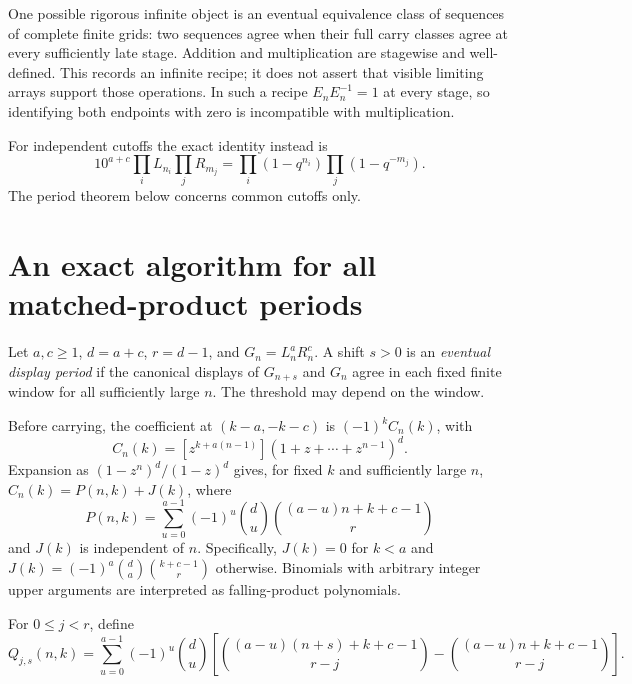\documentclass[11pt]{article}
\begin{document}
One possible rigorous infinite object is an eventual equivalence class of
sequences of complete finite grids: two sequences agree when their full
carry classes agree at every sufficiently late stage. Addition and
multiplication are stagewise and well-defined. This records an infinite
recipe; it does not assert that visible limiting arrays support those
operations. In such a recipe $E_nE_n^{-1}=1$ at every stage, so identifying
both endpoints with zero is incompatible with multiplication.

For independent cutoffs the exact identity instead is
\[
 10^{a+c}\prod_iL_{n_i}\prod_jR_{m_j}
 =\prod_i(1-q^{n_i})\prod_j(1-q^{-m_j}).
\]
The period theorem below concerns common cutoffs only.

\section{An exact algorithm for all matched-product periods}
Let $a,c\ge1$, $d=a+c$, $r=d-1$, and $G_n=L_n^aR_n^c$.
A shift $s>0$ is an \emph{eventual display period} if the canonical displays
of $G_{n+s}$ and $G_n$ agree in each fixed finite window for all sufficiently
large $n$. The threshold may depend on the window.

Before carrying, the coefficient at $(k-a,-k-c)$ is $(-1)^k C_n(k)$, with
\[
 C_n(k)=[z^{k+a(n-1)}](1+z+\cdots+z^{n-1})^d.
\]
Expansion as $(1-z^n)^d/(1-z)^d$ gives, for fixed $k$ and sufficiently
large $n$, $C_n(k)=P(n,k)+J(k)$, where
\[
 P(n,k)=\sum_{u=0}^{a-1}(-1)^u\binom du
                 \binom{(a-u)n+k+c-1}{r}
\]
and $J(k)$ is independent of $n$. Specifically, $J(k)=0$ for $k<a$ and
$J(k)=(-1)^a\binom da\binom{k+c-1}{r}$ otherwise. Binomials with arbitrary
integer upper arguments are interpreted as falling-product polynomials.

For $0\le j<r$, define
\begin{equation}\label{eq:Q}
 Q_{j,s}(n,k)=\sum_{u=0}^{a-1}(-1)^u\binom du
 \left[\binom{(a-u)(n+s)+k+c-1}{r-j}
       -\binom{(a-u)n+k+c-1}{r-j}\right].
\end{equation}
\end{document}
